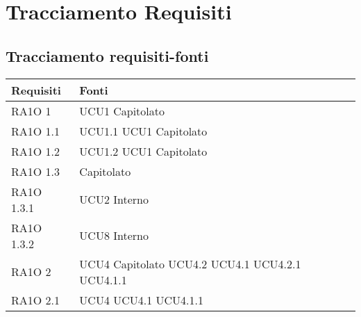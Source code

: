 \section{Tracciamento Requisiti}
\subsection{Tracciamento requisiti-fonti}
      \begin{center}
      \bgroup
      \def\arraystretch{1.8}
      \begin{longtable}{ | p{5cm} | p{5cm} |}
    
      \cellcolor[gray]{0.9} \textbf{Requisiti} & \cellcolor[gray]{0.9} \textbf{Fonti} \\ \hline       
        RA1O 1 &  UCU1 \newline  Capitolato \newline  \\ \hline      
        RA1O 1.1 &  UCU1.1 \newline  UCU1 \newline  Capitolato \newline  \\ \hline      
        RA1O 1.2 &  UCU1.2 \newline  UCU1 \newline  Capitolato \newline  \\ \hline      
        RA1O 1.3  &  Capitolato \newline  \\ \hline      
        RA1O 1.3.1 &  UCU2 \newline  Interno \newline  \\ \hline      
        RA1O 1.3.2 &  UCU8 \newline  Interno \newline  \\ \hline      
        RA1O 2  &  UCU4 \newline  Capitolato \newline  UCU4.2 \newline  UCU4.1 \newline  UCU4.2.1 \newline  UCU4.1.1 \newline  \\ \hline      
        RA1O 2.1 &  UCU4 \newline  UCU4.1 \newline  UCU4.1.1 \newline  \\ \hline      

\end{longtable}
\end{center}
